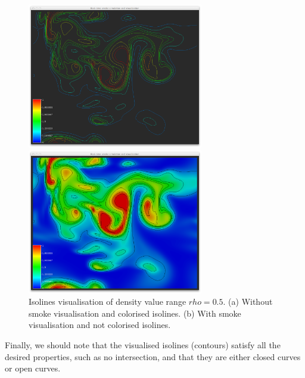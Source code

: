\begin{figure}[htbp]
\begin{center}
\begin{minipage}[t]{0.48\textwidth}
\includegraphics[height=2.5in]{figures/isolines/isolines.png}
\end{minipage}
\begin{minipage}[t]{0.48\textwidth}
\includegraphics[height=2.5in]{figures/isolines/isolinesSmoke.png}
\end{minipage}
\caption{Isolines visualisation of density value range $rho = 0.5$. (a) Without smoke visualisation and colorised isolines. (b) With smoke visualisation and not colorised isolines.}
\label{fig:isolines}
\end{center}
\end{figure}

Finally, we should note that the visualised isolines (contours) satisfy all the desired properties, such as no intersection, and that they are either closed curves or open curves.